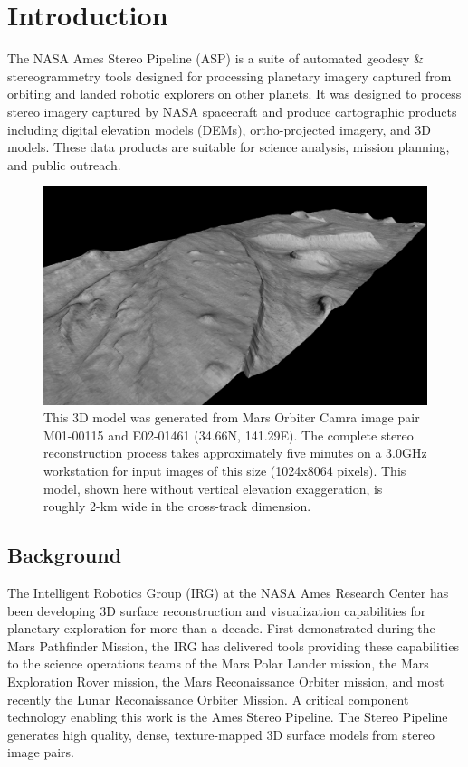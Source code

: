 \chapter{Introduction}

The NASA Ames Stereo Pipeline (ASP) is a suite of automated geodesy \&
stereogrammetry tools designed for processing planetary imagery
captured from orbiting and landed robotic explorers on other planets.
It was designed to process stereo imagery captured by NASA spacecraft
and produce cartographic products including digital elevation models
(DEMs), ortho-projected imagery, and 3D models.  These data products
are suitable for science analysis, mission planning, and public
outreach.

\begin{figure}[tb] 
   \centering
   \includegraphics[width=6.5in]{images/introduction/p19view2.png} 
   \caption{This 3D model was generated from Mars Orbiter Camra image
     pair M01-00115 and E02-01461 (34.66N, 141.29E).  The complete
     stereo reconstruction process takes approximately five minutes on
     a 3.0GHz workstation for input images of this size (1024x8064
     pixels).  This model, shown here without vertical elevation
     exaggeration, is roughly 2-km wide in the cross-track
     dimension. }
   \label{fig:p19}
\end{figure}

\section{Background}

The Intelligent Robotics Group (IRG) at the NASA Ames Research Center
has been developing 3D surface reconstruction and visualization
capabilities for planetary exploration for more than a decade.  First
demonstrated during the Mars Pathfinder Mission, the IRG has delivered
tools providing these capabilities to the science operations teams of
the Mars Polar Lander mission, the Mars Exploration Rover mission, the
Mars Reconaissance Orbiter mission, and most recently the Lunar
Reconaissance Orbiter Mission. A critical component technology
enabling this work is the Ames Stereo Pipeline.  The Stereo Pipeline
generates high quality, dense, texture-mapped 3D surface models from
stereo image pairs.

